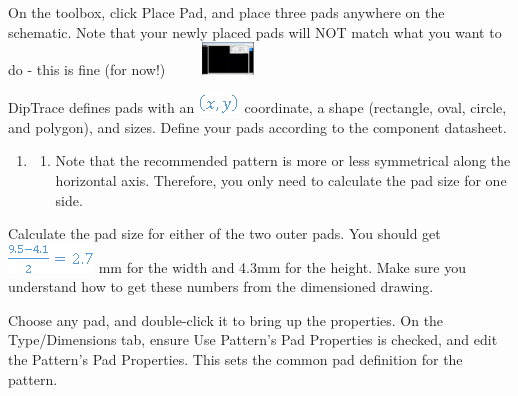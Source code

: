 \documentclass[letterpaper]{article}
\newcounter{saveenum}
\newcommand\liststyleRTFNumxi{%
\renewcommand\theenumi{\arabic{enumi}}
\renewcommand\theenumii{\alph{enumii}}
\renewcommand\theenumiii{\roman{enumiii}}
\renewcommand\theenumiv{\arabic{enumiv}}
\renewcommand\labelenumi{\theenumi.}
\renewcommand\labelenumii{\theenumii.}
\renewcommand\labelenumiii{\theenumiii.}
\renewcommand\labelenumiv{\theenumiv.}
}
\begin{document}
{\sffamily\color[rgb]{0.30980393,0.5058824,0.7411765}
On the toolbox, click {\textquotedbl}Place Pad,{\textquotedbl} and place three pads anywhere on the schematic. Note that
your newly placed pads will NOT match what you want to do - this is fine (for now!)\newline
 \includegraphics[width=1.2181in,height=0.3374in]{figures/ee4document-img030.png} }

{\sffamily\color[rgb]{0.30980393,0.5058824,0.7411765}
DipTrace defines pads with an  \includegraphics[width=0.4272in,height=0.2083in]{figures/ee4document-img031.png}  coordinate, a
shape (rectangle, oval, circle, and polygon), and sizes. Define your pads according to the component datasheet.}

\liststyleRTFNumxi
\setcounter{saveenum}{\value{enumi}}
\begin{enumerate}
\setcounter{enumi}{\value{saveenum}}
\item \setcounter{saveenum}{\value{enumii}}
\begin{enumerate}
\setcounter{enumii}{\value{saveenum}}
\item {\sffamily\color[rgb]{0.30980393,0.5058824,0.7411765}
Note that the recommended pattern is more or less symmetrical along the horizontal axis. Therefore, you only need to
calculate the pad size for one side.}
\end{enumerate}
\end{enumerate}
{\sffamily\color[rgb]{0.30980393,0.5058824,0.7411765}
Calculate the pad size for either of the two outer pads.\newline
You should get  \includegraphics[width=0.8957in,height=0.302in]{figures/ee4document-img032.png}  mm for the width and 4.3mm for
the height. Make sure you understand how to get these numbers from the dimensioned drawing.}

{\sffamily\color[rgb]{0.30980393,0.5058824,0.7411765}
Choose any pad, and double-click it to bring up the properties. On the Type/Dimensions tab, ensure {\textquotedbl}Use
Pattern's Pad Properties{\textquotedbl} is checked, and edit the Pattern's Pad Properties. This sets the common pad
definition for the pattern.}
\end{document}
